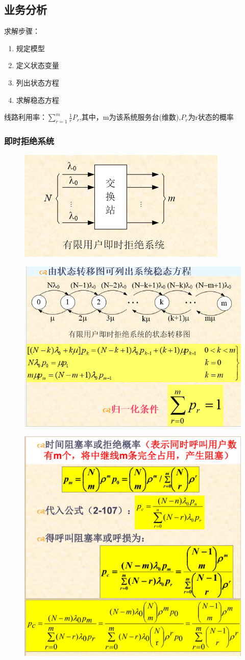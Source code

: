 \subsection{业务分析}
求解步骤：
\begin{enumerate}
	\item 规定模型
	\item 定义状态变量
	\item 列出状态方程
	\item 求解稳态方程
\end{enumerate}
线路利用率：\( \sum_{r=1}^{m}\frac{1}{r}P_r  \),其中，m为该系统服务台(维数),$P_r$为r状态的概率
\subsubsection{即时拒绝系统}
\begin{figure}[H]
	\centering
	\includegraphics[width=0.7\linewidth]{figures/screenshot031}
	\caption{}
	\label{fig:screenshot031}
\end{figure}
\begin{figure}[H]
	\centering
	\includegraphics[width=0.7\linewidth]{figures/screenshot032}
	\caption{}
	\label{fig:screenshot032}
\end{figure}

\begin{figure}[H]
	\centering
	\includegraphics[width=0.5\linewidth]{figures/prove_7}
	\caption{}
	\label{fig:prove7}
\end{figure}
